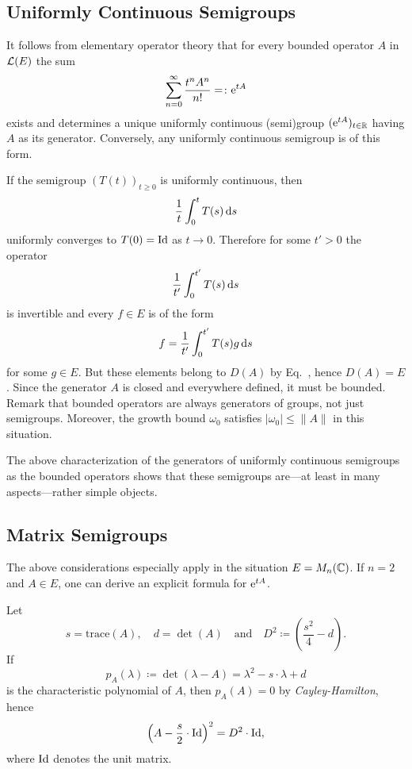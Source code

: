 \subsection{Uniformly Continuous Semigroups}\label{subsec:a1-2.1}%
It follows from elementary operator theory that for every bounded operator $A$ in  $\mathcal{L}(E)$ the sum
\[
    \sum_{n=0}^{\infty} \frac{t^{n}A^{n}}{n!} = \colon  \mathrm{e}^{tA}
\]
exists and determines a unique uniformly continuous (semi)group $( \mathrm{e}^{tA})_{t \in \mathbb{R}}$ having $A$ as its generator.
Conversely, any uniformly continuous semigroup is of this form.

If the semigroup $(T(t))_{t \geq 0}$ is uniformly continuous, then 
%
\[
	\frac{1}{t}\int_{0}^{t} T(s) \mathop{}\!\mathrm{d}{s}
\]
%
uniformly converges to $T(0)=\operatorname{Id}$ as $t \to 0$.
Therefore for some $t' > 0$ the ope\-rator 
%
\[
	\frac{1}{t'}\int_{0}^{t'} T(s) \mathop{}\!\mathrm{d}{s}
\]
%
is invertible and every $f \in E$ is of the form 
%
\[
	f = \frac{1}{t'}\int_{0}^{t'} T(s)g \mathop{}\!\mathrm{d}{s}
\]
%
for some $g \in E$.
But these elements belong to $D(A)$ by Eq.~, hence $D(A) = E$.
Since the generator $A$ is closed and everywhere defined, it must be bounded.
Remark that bounded operators are always generators of groups, not just semigroups.
Moreover, the growth bound $\omega_0$ satisfies $|\omega_0| \leq \|A\|$ in this situation.

The above characterization of the generators of uniformly continuous semigroups as the bounded operators shows that these semigroups are---at least in many aspects---rather simple objects.
\subsection{Matrix Semigroups}\label{subsec:a1-2.2}%
The above considerations especially apply in the situation $E = M_{n}(\mathbb{C})$.
If\/ $n = 2$ and $A \in E$, one can derive an explicit formula for $ \mathrm{e}^{tA}$. 

Let %
\[
	s = \text{trace}(A), 
	\quad 
	d = \det(A) 
	\quad \text{and} \quad
	D^{2} \coloneq \left( \frac{s^{2}}{4} - d \right).
\]
%
If   
\[
p_A(\lambda) \coloneq \det(\lambda - A) = \lambda^2-s\cdot \lambda + d 
\]
is the characteristic polynomial  of\/ $ A $, then $ p_{A}(A) = 0 $ by \emph{Cayley-Hamilton}, hence
%
\[
	\left( A - \frac{s}{2} \cdot \operatorname{Id} \right)^{2} = D^{2} \cdot \operatorname{Id} , 
\]
%
where $ \operatorname{Id} $ denotes the unit matrix.

